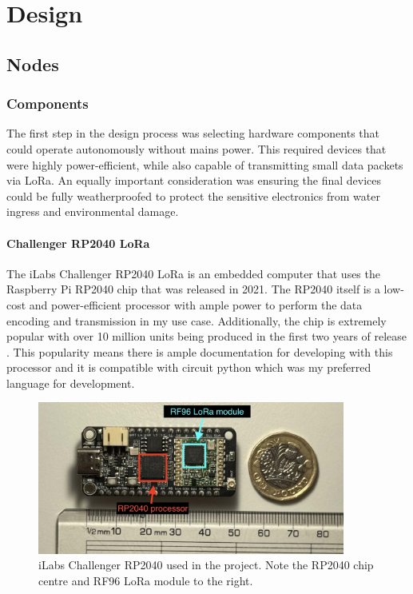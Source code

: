 \section{Design}

\subsection{Nodes}

\subsubsection{Components}

The first step in the design process was selecting hardware components that
could operate autonomously without mains power. This required devices that were
highly power-efficient, while also capable of transmitting small data
packets via LoRa. An equally important consideration was ensuring the final
devices could be fully weatherproofed to protect the sensitive electronics from
water ingress and environmental damage.

\paragraph{Challenger RP2040 LoRa}

The iLabs Challenger RP2040 LoRa is an embedded computer that uses the Raspberry Pi
RP2040 chip that was released in 2021. The RP2040 itself is a low-cost and
power-efficient processor with ample power to perform the data encoding and
transmission in my use case. Additionally, the chip is extremely popular with
over 10 million units being produced in the first two years of release
\cite{pounder2023}. This popularity means there is ample documentation for
developing with this processor and it is compatible with circuit python which was
my preferred language for development.

\begin{figure}[H]
    \centering
    \includegraphics[width=0.9\textwidth]{contents/22-hw-design/22-fig/challenger-rp2040.jpg}
    \caption{iLabs Challenger RP2040 used in the project. Note the RP2040 chip centre and RF96 LoRa module to the right.}
    \label{fig:challenger-rp2040}
\end{figure}

